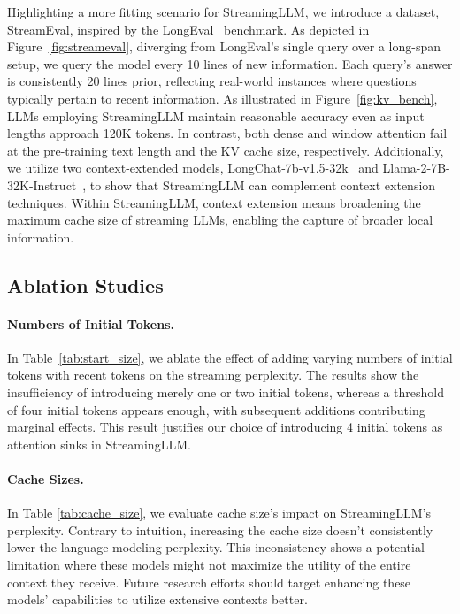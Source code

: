 Highlighting a more fitting scenario for StreamingLLM, we introduce a dataset, StreamEval, inspired by the LongEval~\citep{longchat2023} benchmark. As depicted in Figure~\ref{fig:streameval}, diverging from LongEval's single query over a long-span setup, we query the model every 10 lines of new information. Each query's answer is consistently 20 lines prior, reflecting real-world instances where questions typically pertain to recent information. As illustrated in Figure~\ref{fig:kv_bench}, LLMs employing StreamingLLM maintain reasonable accuracy even as input lengths approach 120K tokens. In contrast, both dense and window attention fail at the pre-training text length and the KV cache size, respectively. Additionally, we utilize two context-extended models, LongChat-7b-v1.5-32k~\citep{longchat2023} and Llama-2-7B-32K-Instruct~\citep{togetherlong}, to show that StreamingLLM can complement context extension techniques. Within StreamingLLM, context extension means broadening the maximum cache size of streaming LLMs, enabling the capture of broader local information.

\subsection{Ablation Studies}

\paragraph{Numbers of Initial Tokens.} In Table~\ref{tab:start_size}, we ablate the effect of adding varying numbers of initial tokens with recent tokens on the streaming perplexity. The results show the insufficiency of introducing merely one or two initial tokens, whereas a threshold of four initial tokens appears enough, with subsequent additions contributing marginal effects. This result justifies our choice of introducing 4 initial tokens as attention sinks in StreamingLLM.

\paragraph{Cache Sizes.} In Table \ref{tab:cache_size}, we evaluate cache size's impact on StreamingLLM's perplexity. Contrary to intuition, increasing the cache size doesn't consistently lower the language modeling perplexity. This inconsistency shows a potential limitation where these models might not maximize the utility of the entire context they receive. Future research efforts should target enhancing these models' capabilities to utilize extensive contexts better.

